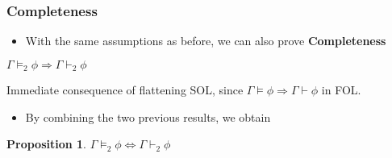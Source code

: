 \documentclass{beamer}
\newenvironment{proofidea}{
    \renewcommand{\proofname}{Proof idea.}\proof
}{\endproof}
\newtheorem{proposition}{Proposition}
\begin{document}
                \begin{frame}
                    \frametitle{Completeness}
                    \begin{itemize}
                        \item With the same assumptions as before, we can also prove \textbf{Completeness}
                    \end{itemize}
                    \begin{theorem}[Completeness]
                        $ \Gamma \vDash_2 \phi \Rightarrow \Gamma \vdash_2 \phi $
                    \end{theorem}
                    \begin{proofidea}
                        Immediate consequence of flattening SOL, since $ \Gamma \vDash \phi \Rightarrow \Gamma \vdash \phi $ in FOL.
                    \end{proofidea}
                    \begin{itemize}
                        \item By combining the two previous results, we obtain
                    \end{itemize}
                    \begin{proposition}
                        $ \Gamma \vDash_2 \phi \Leftrightarrow \Gamma \vdash_2 \phi $
                    \end{proposition}
                \end{frame}
\end{document}
